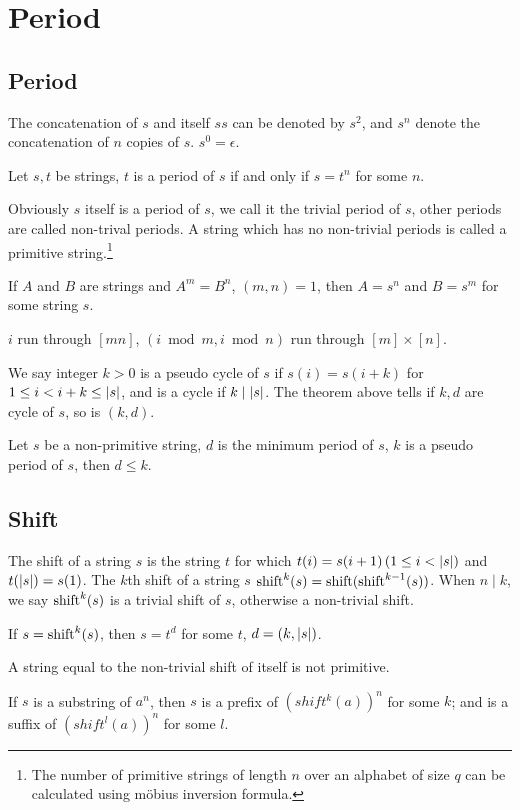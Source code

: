 \section{Period}
\subsection{Period}
The concatenation of $s$ and itself $ss$ can be denoted by
$s^2$, and $s^n$ denote the concatenation of $n$ copies of
$s$. $s^0 = \epsilon$.

\begin{defi}[period]
Let $s, t$ be strings, $t$ is a period of $s$ if and only if
$s = t^n$ for some $n$.
\end{defi}

Obviously $s$ itself is a period of $s$, we call it the trivial 
period of $s$, other periods are called non-trival periods.
A string which has no non-trivial periods is called a primitive 
string.\footnote{The number of primitive strings of length $n$
over an alphabet of size $q$ can be calculated using m\"obius 
inversion formula.}
\begin{thm}
If $A$ and $B$ are strings and $A^m = B^n$, $(m,n)=1$, then $A=s^n$
and $B=s^m$ for some string $s$.
\end{thm}

\begin{prf}
$i$ run through $[mn]$, $(i \bmod{m} , i \bmod{n})$ run through
$[m] \times [n]$.
\end{prf}

We say integer $k > 0$ is a pseudo cycle of $s$ if $s(i)=s(i+k)$
for $1 \leq i < i + k \leq \left| {s} \right|$, and is a cycle
if $k \mid \left| {s} \right|$. The theorem above tells if $k,d$ are
cycle of $s$, so is $(k,d)$.

\begin{thm}
Let $s$ be a non-primitive string, $d$ is the minimum period of $s$,
$k$ is a pseudo period of $s$, then $d \leq k$.
\end{thm}

\subsection{Shift}
The shift of a string $s$ is the string $t$ for which 
$t(i) = s(i+1) \, (1 \leq i < \left| {s} \right|)$ and $t(\left| {s} \right|) = s(1)$.
The $k$th shift of a string $s$ $\mathop{\mathrm{shift}}^k(s) = \mathop{\mathrm{shift}}(\mathop{\mathrm{shift}}^{k-1}(s))$.
When $n \mid k$, we say $\mathop{\mathrm{shift}}^k(s)$ is a trivial shift of $s$, 
otherwise a non-trivial shift.

\begin{thm}
If $s = \mathop{\mathrm{shift}}^k(s)$, then $s = t^d$ for some $t$, $d = (k,\left| {s} \right|)$.
\end{thm}

\begin{cly}
A string equal to the non-trivial shift of itself is not primitive.
\end{cly}

\begin{thm}
If $s$ is a substring of $a^n$,
then $s$ is a prefix of $(shift^k(a))^n$ for some $k$;
and is a suffix of $(shift^l(a))^n$ for some $l$.
\end{thm}